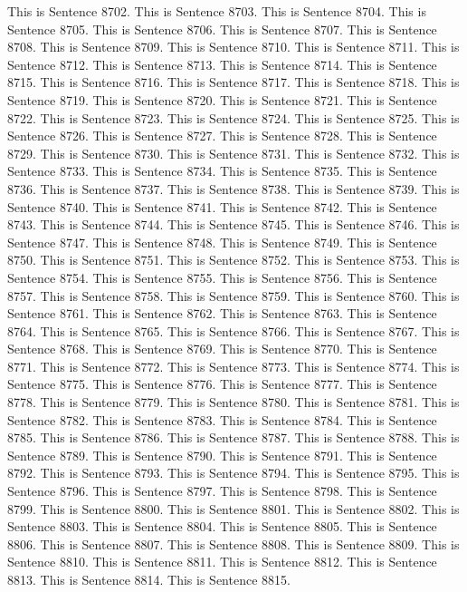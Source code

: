 \documentclass{article}
\begin{document}
This is Sentence 8702.
This is Sentence 8703.
This is Sentence 8704.
This is Sentence 8705.
This is Sentence 8706.
This is Sentence 8707.
This is Sentence 8708.
This is Sentence 8709.
This is Sentence 8710.
This is Sentence 8711.
This is Sentence 8712.
This is Sentence 8713.
This is Sentence 8714.
This is Sentence 8715.
This is Sentence 8716.
This is Sentence 8717.
This is Sentence 8718.
This is Sentence 8719.
This is Sentence 8720.
This is Sentence 8721.
This is Sentence 8722.
This is Sentence 8723.
This is Sentence 8724.
This is Sentence 8725.
This is Sentence 8726.
This is Sentence 8727.
This is Sentence 8728.
This is Sentence 8729.
This is Sentence 8730.
This is Sentence 8731.
This is Sentence 8732.
This is Sentence 8733.
This is Sentence 8734.
This is Sentence 8735.
This is Sentence 8736.
This is Sentence 8737.
This is Sentence 8738.
This is Sentence 8739.
This is Sentence 8740.
This is Sentence 8741.
This is Sentence 8742.
This is Sentence 8743.
This is Sentence 8744.
This is Sentence 8745.
This is Sentence 8746.
This is Sentence 8747.
This is Sentence 8748.
This is Sentence 8749.
This is Sentence 8750.
This is Sentence 8751.
This is Sentence 8752.
This is Sentence 8753.
This is Sentence 8754.
This is Sentence 8755.
This is Sentence 8756.
This is Sentence 8757.
This is Sentence 8758.
This is Sentence 8759.
This is Sentence 8760.
This is Sentence 8761.
This is Sentence 8762.
This is Sentence 8763.
This is Sentence 8764.
This is Sentence 8765.
This is Sentence 8766.
This is Sentence 8767.
This is Sentence 8768.
This is Sentence 8769.
This is Sentence 8770.
This is Sentence 8771.
This is Sentence 8772.
This is Sentence 8773.
This is Sentence 8774.
This is Sentence 8775.
This is Sentence 8776.
This is Sentence 8777.
This is Sentence 8778.
This is Sentence 8779.
This is Sentence 8780.
This is Sentence 8781.
This is Sentence 8782.
This is Sentence 8783.
This is Sentence 8784.
This is Sentence 8785.
This is Sentence 8786.
This is Sentence 8787.
This is Sentence 8788.
This is Sentence 8789.
This is Sentence 8790.
This is Sentence 8791.
This is Sentence 8792.
This is Sentence 8793.
This is Sentence 8794.
This is Sentence 8795.
This is Sentence 8796.
This is Sentence 8797.
This is Sentence 8798.
This is Sentence 8799.
This is Sentence 8800.
This is Sentence 8801.
This is Sentence 8802.
This is Sentence 8803.
This is Sentence 8804.
This is Sentence 8805.
This is Sentence 8806.
This is Sentence 8807.
This is Sentence 8808.
This is Sentence 8809.
This is Sentence 8810.
This is Sentence 8811.
This is Sentence 8812.
This is Sentence 8813.
This is Sentence 8814.
This is Sentence 8815.
\end{document}
